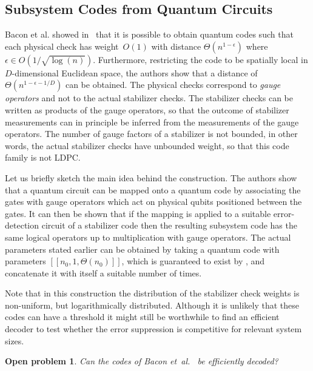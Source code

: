 \documentclass[amsmath, amssymb, floatfix, reprint, twocolumn, notitlepage, 10pt]{revtex4-1}
\newtheorem*{oproblem}{Open problem}
\begin{document}
\subsection{Subsystem Codes from Quantum Circuits}\label{sec:bacom_flammia_harrow_shi}
Bacon et al. showed in~\cite{bacon2017sparse} that it is possible to obtain quantum codes such that each physical check has weight~$O(1)$ with distance $\Theta(n^{1-\epsilon})$ where $\epsilon \in O(1/\sqrt{\log(n)})$.
Furthermore, restricting the code to be spatially local in $D$-dimensional Euclidean space, the authors show that a distance of $\Theta(n^{1-\epsilon-1/D})$ can be obtained.
The physical checks correspond to \emph{gauge operators} and not to the actual stabilizer checks.
The stabilizer checks can be written as products of the gauge operators, so that the outcome of stabilizer measurements can in principle be inferred from the measurements of the gauge operators.
The number of gauge factors of a stabilizer is not bounded, in other words, the actual stabilizer checks have unbounded weight, so that this code family is not LDPC.

Let us briefly sketch the main idea behind the construction.
The authors show that a quantum circuit can be mapped onto a quantum code by associating the gates with gauge operators which act on physical qubits positioned between the gates.
It can then be shown that if the mapping is applied to a suitable error-detection circuit of a stabilizer code then the resulting subsystem code has the same logical operators up to multiplication with gauge operators. 
The actual parameters stated earlier can be obtained by taking a quantum code with parameters $[[n_0,1, \Theta(n_0)]]$, which is guaranteed to exist by \cite{goodquantumcodes}, and concatenate it with itself a suitable number of times.

Note that in this construction the distribution of the stabilizer check weights is non-uniform, but logarithmically distributed.
Although it is unlikely that these codes can have a threshold it might still be worthwhile to find an efficient decoder to test whether the error suppression is competitive for relevant system sizes.
\begin{oproblem}
Can the codes of Bacon et~al.~\cite{bacon2017sparse} be efficiently decoded?
\end{oproblem}
\end{document}
